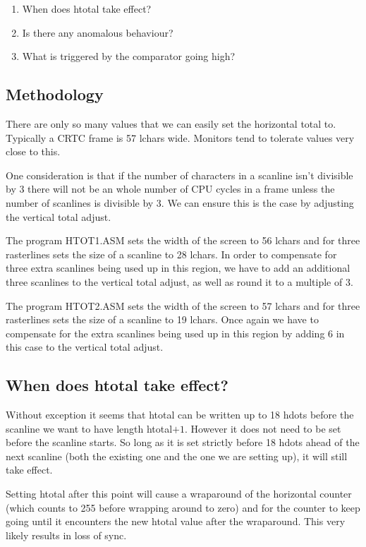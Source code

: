 \documentclass[a4paper,10pt]{amsart}
\begin{document}
\begin{enumerate}
\item When does htotal take effect?
\item Is there any anomalous behaviour?
\item What is triggered by the comparator going high?
\end{enumerate}

\subsection{Methodology}

There are only so many values that we can easily set the horizontal total to.
Typically a CRTC frame is 57 lchars wide. Monitors tend to tolerate values
very close to this.

One consideration is that if the number of characters in a scanline isn't
divisible by 3 there will not be an whole number of CPU cycles in a frame
unless the number of scanlines is divisible by 3. We can ensure this is the
case by adjusting the vertical total adjust.

The program HTOT1.ASM sets the width of the screen to 56 lchars and for three
rasterlines sets the size of a scanline to 28 lchars. In order to compensate
for three extra scanlines being used up in this region, we have to add an
additional three scanlines to the vertical total adjust, as well as round it
to a multiple of 3.

The program HTOT2.ASM sets the width of the screen to 57 lchars and for three
rasterlines sets the size of a scanline to 19 lchars. Once again we have to
compensate for the extra scanlines being used up in this region by adding
6 in this case to the vertical total adjust.

\subsection{When does htotal take effect?}

Without exception it seems that htotal can be written up to 18 hdots before the
scanline we want to have length htotal$+1$. However it does not need to be set
before the scanline starts. So long as it is set strictly before 18 hdots ahead
of the next scanline (both the existing one and the one we are setting up), it
will still take effect.

Setting htotal after this point will cause a wraparound of the horizontal
counter (which counts to 255 before wrapping around to zero) and for the
counter to keep going until it encounters the new htotal value after the
wraparound. This very likely results in loss of sync.
\end{document}
